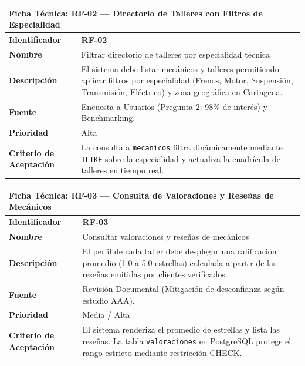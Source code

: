 \documentclass[11pt,letterpaper]{article}
\begin{document}
\begin{table}[h!]
\centering
\small
\begin{tabularx}{\textwidth}{p{3.5cm}X}
\toprule
\multicolumn{2}{l}{\textbf{\color{darkblue}Ficha Técnica: RF-02 — Directorio de Talleres con Filtros de Especialidad}} \\
\midrule
\textbf{Identificador} & \textbf{RF-02} \\
\textbf{Nombre} & Filtrar directorio de talleres por especialidad técnica \\
\textbf{Descripción} & El sistema debe listar mecánicos y talleres permitiendo aplicar filtros por especialidad (Frenos, Motor, Suspensión, Transmisión, Eléctrico) y zona geográfica en Cartagena. \\
\textbf{Fuente} & Encuesta a Usuarios (Pregunta 2: 98\% de interés) y Benchmarking. \\
\textbf{Prioridad} & Alta \\
\textbf{Criterio de Aceptación} & La consulta a \texttt{mecanicos} filtra dinámicamente mediante \texttt{ILIKE} sobre la especialidad y actualiza la cuadrícula de talleres en tiempo real. \\
\bottomrule
\end{tabularx}
\end{table}

\begin{table}[h!]
\centering
\small
\begin{tabularx}{\textwidth}{p{3.5cm}X}
\toprule
\multicolumn{2}{l}{\textbf{\color{darkblue}Ficha Técnica: RF-03 — Consulta de Valoraciones y Reseñas de Mecánicos}} \\
\midrule
\textbf{Identificador} & \textbf{RF-03} \\
\textbf{Nombre} & Consultar valoraciones y reseñas de mecánicos \\
\textbf{Descripción} & El perfil de cada taller debe desplegar una calificación promedio (1.0 a 5.0 estrellas) calculada a partir de las reseñas emitidas por clientes verificados. \\
\textbf{Fuente} & Revisión Documental (Mitigación de desconfianza según estudio AAA). \\
\textbf{Prioridad} & Media / Alta \\
\textbf{Criterio de Aceptación} & El sistema renderiza el promedio de estrellas y lista las reseñas. La tabla \texttt{valoraciones} en PostgreSQL protege el rango estricto mediante restricción CHECK. \\
\bottomrule
\end{tabularx}
\end{table}
\end{document}
